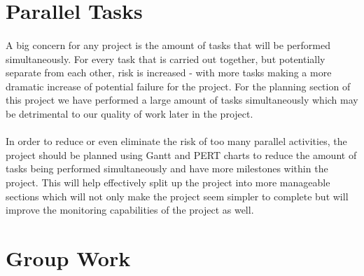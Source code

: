 \begin{comment}

Resources used in the production of this file:
1 - The Benefits of Risk Assessment for Projects, Portfolios, and Businesses
    An Oracle White Paper June 2009    http://www.oracle.com/us/042743.pdf
2 - 130 Project Risks (List)
    posted by Anna Mar, Simplicable, March 11, 2013 
    http://management.simplicable.com/management/new/130-project-risks

\end{comment}


\section{Parallel Tasks}
\paragraph{}
\cite{OracleWP}
A big concern for any project is the amount of tasks that will be performed
simultaneously.  For every task that is carried out together, but potentially
separate from each other, risk is increased - with more tasks making a more
dramatic increase of potential failure for the project.  For the planning
section of this project we have performed a large amount of tasks simultaneously
which may be detrimental to our quality of work later in the project.

\paragraph{}

In order to reduce or even eliminate the risk of too many parallel activities,
the project should be planned using Gantt and PERT charts to reduce the amount
of tasks being performed simultaneously and have more milestones within the
project.  This will help effectively split up the project into more manageable
sections which will not only make the project seem simpler to complete but will
improve the monitoring capabilities of the project as well.

\section{Group Work}
\paragraph{}

